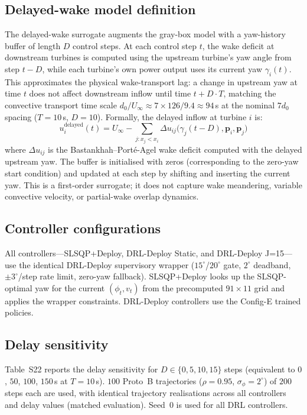 \documentclass{article}
\begin{document}
\subsection{Delayed-wake model definition}

The delayed-wake surrogate augments the gray-box model with a yaw-history buffer of length $D$ control steps. At each control step $t$, the wake deficit at downstream turbines is computed using the upstream turbine's yaw angle from step $t{-}D$, while each turbine's own power output uses its current yaw $\gamma_i(t)$. This approximates the physical wake-transport lag: a change in upstream yaw at time $t$ does not affect downstream inflow until time $t{+}D{\cdot}T$, matching the convective transport time scale $d_0/U_\infty \approx 7{\times}126/9.4 \approx 94$\,s at the nominal $7d_0$ spacing ($T{=}10$\,s, $D{=}10$). Formally, the delayed inflow at turbine $i$ is:
\[
u_i^\mathrm{delayed}(t) = U_\infty - \sum_{j: x_j < x_i} \Delta u_{ij}\big(\gamma_j(t{-}D), \mathbf{p}_i, \mathbf{p}_j\big)
\]
where $\Delta u_{ij}$ is the Bastankhah--Port\'e-Agel wake deficit computed with the delayed upstream yaw. The buffer is initialised with zeros (corresponding to the zero-yaw start condition) and updated at each step by shifting and inserting the current yaw. This is a first-order surrogate; it does not capture wake meandering, variable convective velocity, or partial-wake overlap dynamics.

\subsection{Controller configurations}

All controllers---SLSQP+Deploy, DRL-Deploy Static, and DRL-Deploy J=15---use the identical DRL-Deploy supervisory wrapper ($15^\circ$/$20^\circ$ gate, $2^\circ$ deadband, ${\pm}3^\circ$/step rate limit, zero-yaw fallback). SLSQP+Deploy looks up the SLSQP-optimal yaw for the current $(\phi_t, v_t)$ from the precomputed $91{\times}11$ grid and applies the wrapper constraints. DRL-Deploy controllers use the Config-E trained policies.

\subsection{Delay sensitivity}

Table~S22 reports the delay sensitivity for $D{\in}\{0,5,10,15\}$ steps (equivalent to $0$, $50$, $100$, $150$\,s at $T{=}10$\,s). $100$ Proto~B trajectories ($\rho{=}0.95$, $\sigma_\phi{=}2^\circ$) of $200$ steps each are used, with identical trajectory realisations across all controllers and delay values (matched evaluation). Seed~0 is used for all DRL controllers.
\end{document}

